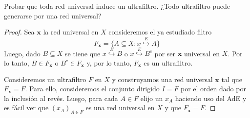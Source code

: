 \documentclass{article}
\theoremstyle{plain}
\theoremstyle{definition}
\newcommand{\evto}[1]{\stackrel{E}{\hookrightarrow} #1}   %
\newenvironment{ejercicio}[1]{\begin{trivlist}
\item[\hskip \labelsep {\bfseries Ejercicio}\hskip \labelsep {\bfseries #1.}]}{\end{trivlist}}
\begin{document}
\begin{ejercicio}{10}
    Probar que toda red universal induce un ultrafiltro. ¿Todo ultrafiltro puede generarse por una red universal?
\end{ejercicio}
\begin{proof}
    Sea \( \mathbf{x} \) la red universal en \( X \) consideremos el ya estudiado filtro \[
        F_{\mathbf{x}} = \{ A \subseteq X : x \evto{A} \}
    \]
    Luego, dado \( B \subseteq X \) se tiene que \( x \evto{B} \) o \( x \evto{B^c} \) por ser \( \mathbf{x} \) universal en \( X \).
    Por lo tanto, \( B \in F_{\mathbf{x}} \) o \( B^c \in F_{\mathbf{x}} \) y, por lo tanto, \( F_{\mathbf{x}} \) es un ultrafiltro.

    Consideremos un ultrafiltro \( F \) en \( X \) y construyamos una red universal \( \mathbf{x} \) tal que \( F_{\mathbf{x}} = F \).
    Para ello, consideremos el conjunto dirigido \( I = F \) por el orden dado por la inclusión al revés. Luego, para cada \( A \in F \)
    elijo un \( x_A \) haciendo uso del AdE y es fácil ver que \( {(x_A)}_{A \in F} \) es una red universal en \( X \) y que \( F_{\mathbf{x}} = F \).
\end{proof}
\end{document}
